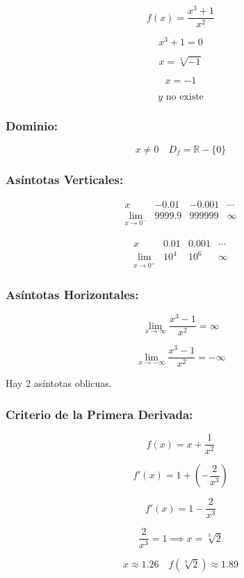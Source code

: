 \[
f(x) = \frac{x^3 + 1}{x^2}
\]

\[
x^3 + 1 = 0
\]

\[
x = \sqrt[3]{-1}
\]

\[
x = -1
\]

\[
y \text{ no existe}
\]

\subsubsection*{Dominio:}

\[
x \neq 0 \quad D_f = \mathbb{R} - \{0\}
\]

\subsubsection*{Asíntotas Verticales:}

\[
\begin{array}{c|c|c|c}
x & -0.01 & -0.001 & \cdots \\
\hline
\lim_{x \to 0^-} & 9999.9 & 999999 & \infty
\end{array}
\]

\[
\begin{array}{c|c|c|c}
x & 0.01 & 0.001 & \cdots \\
\hline
\lim_{x \to 0^+} & 10^4 & 10^6 & \infty
\end{array}
\]


\subsubsection*{Asíntotas Horizontales:}

\[
\lim_{x \to \infty} \frac{x^3 - 1}{x^2} = \infty
\]

\[
\lim_{x \to -\infty} \frac{x^3 - 1}{x^2} = -\infty
\]

Hay 2 asíntotas oblicuas.

\subsubsection*{Criterio de la Primera Derivada:}

\[
f(x) = x + \frac{1}{x^2}
\]

\[
f'(x) = 1 + \left(-\frac{2}{x^3}\right)
\]

\[
f'(x) = 1 - \frac{2}{x^3}
\]

\[
\frac{2}{x^3} = 1 \implies x = \sqrt[3]{2}
\]

\[
x \approx 1.26 \quad f(\sqrt[3]{2}) \approx 1.89
\]


